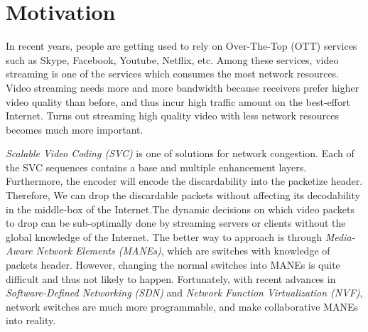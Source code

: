 \section{Motivation} \label{sec:motivation}

In recent years, people are getting used to rely on Over-The-Top (OTT) 
services such as Skype, Facebook, Youtube, Netflix, etc. 
Among these services, video streaming is one of the services which 
consumes the most network resources. Video streaming needs more and more bandwidth because receivers prefer higher video quality than before, and thus incur high traffic amount on the best-effort Internet. Turns out streaming high quality video with less network resources becomes much more important.

{\em Scalable Video Coding (SVC) }is one of solutions for network congestion. Each of the SVC sequences contains a base and multiple enhancement layers. Furthermore, the encoder will encode the discardability into the packetize header. Therefore, We can drop the discardable packets without affecting its decodability in the middle-box of the Internet.The dynamic decisions on which video packets to drop can be sub-optimally done by streaming servers or clients without the global knowledge of the Internet. The better way to approach is through {\em Media-Aware Network Elements (MANEs)}, which are switches with knowledge of packets header. However, changing the normal switches into MANEs is quite difficult and thus not likely to happen. Fortunately, with recent advances in {\em Software-Defined Networking (SDN)} and {\em Network Function Virtualization (NVF)}, network switches are much more programmable, and make collaborative MANEs into reality. 




